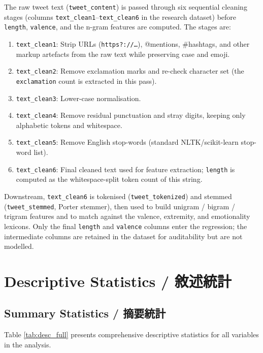 \documentclass[12pt,a4paper,fontset=none]{ctexart}
\begin{document}
The raw tweet text (\texttt{tweet\_content}) is passed through six sequential cleaning stages (columns \texttt{text\_clean1}--\texttt{text\_clean6} in the research dataset) before \texttt{length}, \texttt{valence}, and the n-gram features are computed. The stages are:

\begin{enumerate}
    \item \texttt{text\_clean1}: Strip URLs (\texttt{https?://\dots}), @mentions, \#hashtags, and other markup artefacts from the raw text while preserving case and emoji.
    \item \texttt{text\_clean2}: Remove exclamation marks and re-check character set (the \texttt{exclamation} count is extracted in this pass).
    \item \texttt{text\_clean3}: Lower-case normalisation.
    \item \texttt{text\_clean4}: Remove residual punctuation and stray digits, keeping only alphabetic tokens and whitespace.
    \item \texttt{text\_clean5}: Remove English stop-words (standard NLTK/scikit-learn stop-word list).
    \item \texttt{text\_clean6}: Final cleaned text used for feature extraction; \texttt{length} is computed as the whitespace-split token count of this string.
\end{enumerate}

Downstream, \texttt{text\_clean6} is tokenised (\texttt{tweet\_tokenized}) and stemmed (\texttt{tweet\_stemmed}, Porter stemmer), then used to build unigram / bigram / trigram features and to match against the valence, extremity, and emotionality lexicons. Only the final \texttt{length} and \texttt{valence} columns enter the regression; the intermediate columns are retained in the dataset for auditability but are not modelled.

\newpage

\section{Descriptive Statistics / 敘述統計}

\subsection{Summary Statistics / 摘要統計}

Table \ref{tab:desc_full} presents comprehensive descriptive statistics for all variables in the analysis.
\end{document}
